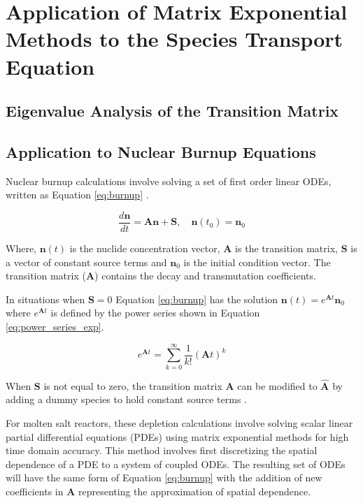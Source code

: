 \chapter{Application of Matrix Exponential Methods to the Species Transport Equation}\label{ch:application}

\section{Eigenvalue Analysis of the Transition Matrix}

\section{Application to Nuclear Burnup Equations}

Nuclear burnup calculations involve solving a set of first order linear ODEs, written as Equation \ref{eq:burnup}  \cite{pusa2010}.

\begin{equation}
    \frac{d\boldsymbol{n}}{dt} = \boldsymbol{A}\boldsymbol{n} + \boldsymbol{S}, \quad \boldsymbol{n}(t_{0}) = \boldsymbol{n}_{0}
    \label{eq:burnup}
\end{equation}

Where, $\boldsymbol{n}(t)$ is the nuclide concentration vector, $\boldsymbol{A}$ is the transition matrix, $\boldsymbol{S}$ is a vector of constant source terms and $\boldsymbol{n}_{0}$ is the initial condition vector. The transition matrix ($\boldsymbol{A}$) contains the decay and transmutation coefficients. 

In situations when $\boldsymbol{S} = 0$ Equation \ref{eq:burnup} has the solution $\boldsymbol{n}(t) = e^{\boldsymbol{A}t}\boldsymbol{n}_{0}$ where $e^{\boldsymbol{A}t}$ is defined by the power series shown in Equation \ref{eq:power_series_exp}\cite{pusa2010}\cite{moler2003}.

\begin{equation}
    e^{\boldsymbol{A}t} = \sum_{k = 0}^{\infty}\frac{1}{k!}(\boldsymbol{A}t)^{k}
    \label{eq:power_series_exp}
\end{equation}

When $\boldsymbol{S}$ is not equal to zero, the transition matrix $\boldsymbol{A}$ can be modified to $\hat{\boldsymbol{A}}$ by adding a dummy species to hold constant source terms \cite{isotalo2015}. 

For molten salt reactors, these depletion calculations involve solving scalar linear partial differential equations (PDEs) using matrix exponential methods for high time domain accuracy. This method involves first discretizing the spatial dependence of a PDE to a system of coupled ODEs. The resulting set of ODEs will have the same form of Equation \ref{eq:burnup} with the addition of new coefficients in $\boldsymbol{A}$ representing the approximation of spatial dependence. 
